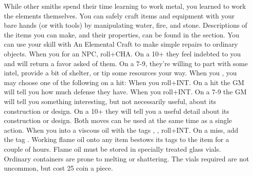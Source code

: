 \documentclass[darkmode]{dw_playbook}
\begin{document}
    {
            {While other smiths spend their time learning to work metal, you learned to work the elements themselves.  You can safely craft items and equipment with your bare hands (or with tools) by manipulating water, fire, and stone.  Descriptions of the items you can make, and their properties, can be found in the  section.}
        \gap
            {You can use your skill with An Elemental Craft to make simple repairs to ordinary objects. When you  for an NPC, roll+CHA.  On a 10+ they feel indebted to you and will return a favor asked of them.  On a 7-9, they’re willing to part with some intel, provide a bit of shelter, or tip some resources your way.}
        \gap
            {When you , you may choose one of the following on a hit:
            \gapSm
            \gapSm
            }
            {When you  roll+INT.  On a hit the GM will tell you how much defense they have.
            \gap
            When you  roll+INT.  On a 7-9 the GM will tell you something interesting, but not necessarily useful, about its construction or design.  On a 10+ they will tell you a useful detail about its construction or design.
            \gap
            Both moves can be used at the same time as a single action.}
        \gap
            {When you  into a viscous oil with the tags , , roll+INT.  On a miss, add the tag .  Working flame oil onto any item bestows its tags to the item for a couple of hours.
            \gap
            Flame oil must be stored in specially treated glass vials.  Ordinary containers are prone to melting or shattering.  The vials required are not uncommon, but cost 25 coin a piece.}
    }

\clearpage
~
\end{document}
